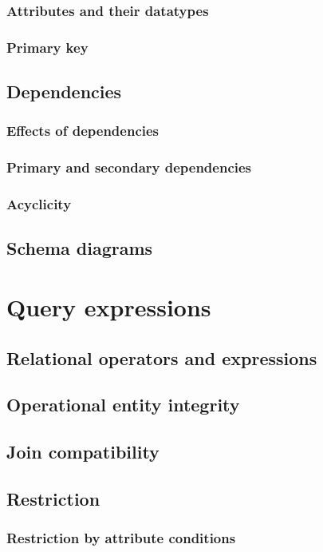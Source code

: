 \documentclass[letter,twocolumn,11pt]{article}
\begin{document}
\subsubsection{Attributes and their datatypes}
\subsubsection{Primary key}

\subsection{Dependencies}
\subsubsection{Effects of dependencies}
\subsubsection{Primary and secondary dependencies}
\subsubsection{Acyclicity}

\subsection{Schema diagrams}

\section{Query expressions}
\subsection{Relational operators and expressions}
\subsection{Operational entity integrity}
\subsection{Join compatibility}
\subsection{Restriction}
\subsubsection{Restriction by attribute conditions}
\end{document}
